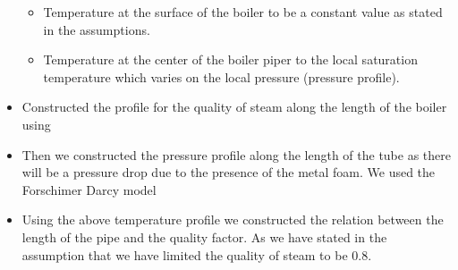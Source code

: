 \documentclass[compileTAMUreport.tex]{subfiles}
\begin{document}
\begin{itemize}
\begin{itemize}
\item Temperature at the surface of the boiler to be a constant value as stated in the assumptions.
\item Temperature at the center of the boiler piper to the local saturation temperature which varies on the local pressure (pressure profile).
\end{itemize}
\item	Constructed the profile for the quality of steam along the length of the boiler using 
\item	Then we constructed the pressure profile along the length of the tube as there will be a pressure drop due to the presence of the metal foam.  We used the Forschimer Darcy model \cite{Xu2012}

\item Using the above temperature profile we constructed the relation between the length of the pipe and the quality factor. As we have stated in the assumption that we have limited the quality of steam to be 0.8.
\end{itemize}
\end{document}
